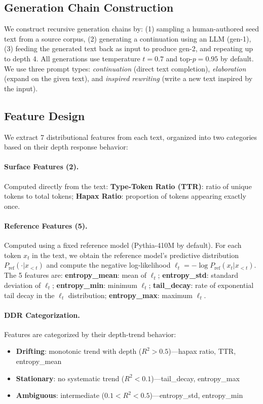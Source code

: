 \documentclass[11pt]{article}
\begin{document}
\subsection{Generation Chain Construction}

We construct recursive generation chains by: (1) sampling a human-authored seed text from a source corpus, (2) generating a continuation using an LLM (gen-1), (3) feeding the generated text back as input to produce gen-2, and repeating up to depth 4. All generations use temperature $t = 0.7$ and top-$p = 0.95$ by default. We use three prompt types: \textit{continuation} (direct text completion), \textit{elaboration} (expand on the given text), and \textit{inspired rewriting} (write a new text inspired by the input).

\subsection{Feature Design}
\label{sec:features}

We extract 7 distributional features from each text, organized into two categories based on their depth response behavior:

\paragraph{Surface Features (2).} Computed directly from the text: \textbf{Type-Token Ratio (TTR)}: ratio of unique tokens to total tokens; \textbf{Hapax Ratio}: proportion of tokens appearing exactly once.

\paragraph{Reference Features (5).} Computed using a fixed reference model (Pythia-410M by default). For each token $x_t$ in the text, we obtain the reference model's predictive distribution $P_{\text{ref}}(\cdot | x_{<t})$ and compute the negative log-likelihood $\ell_t = -\log P_{\text{ref}}(x_t | x_{<t})$. The 5 features are: \textbf{entropy\_mean}: mean of $\ell_t$; \textbf{entropy\_std}: standard deviation of $\ell_t$; \textbf{entropy\_min}: minimum $\ell_t$; \textbf{tail\_decay}: rate of exponential tail decay in the $\ell_t$ distribution; \textbf{entropy\_max}: maximum $\ell_t$.

\paragraph{DDR Categorization.} Features are categorized by their depth-trend behavior:
\begin{itemize}[nosep]
    \item \textbf{Drifting}: monotonic trend with depth ($R^2 > 0.5$)---hapax ratio, TTR, entropy\_mean
    \item \textbf{Stationary}: no systematic trend ($R^2 < 0.1$)---tail\_decay, entropy\_max
    \item \textbf{Ambiguous}: intermediate ($0.1 < R^2 < 0.5$)---entropy\_std, entropy\_min
\end{itemize}
\end{document}
